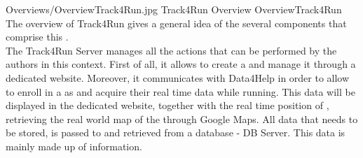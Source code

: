 \documentclass[../../DD.tex]{subfiles}
\begin{document}
	\image {13cm} {Overviews/OverviewTrack4Run.jpg} {Track4Run Overview} {OverviewTrack4Run}
	The overview of Track4Run gives a general idea of the several components that comprise this .\\
	The Track4Run Server manages all the actions that can be performed by the authors in this context. First of all, it allows  to create a  and manage it through a dedicated website. Moreover, it communicates with Data4Help in order to allow  to enroll in a  as  and acquire their real time data while running. This data will be displayed in the dedicated  website, together with the real time position of , retrieving the real world map of the  through Google Maps. All data that needs to be stored, is passed to and retrieved from a database - DB Server. This data is mainly made up of  information.

	

	
\end{document}
